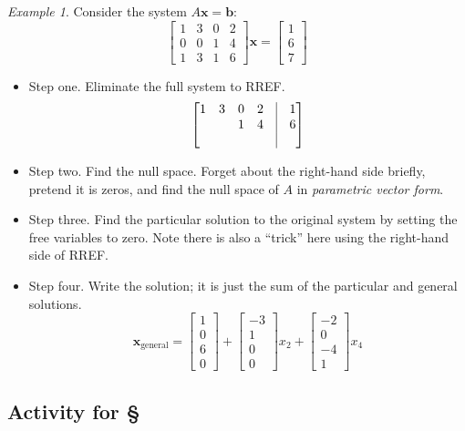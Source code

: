 \documentclass[11pt,oneside]{amsbook}
\theoremstyle{definition}
\theoremstyle{plain}
\theoremstyle{definition}
\theoremstyle{remark}
\newtheorem{example}[theorem]{Example}
\numberwithin{equation}{section}
\numberwithin{figure}{section}
\begin{document}
\begin{example}
  Consider the system $A\mathbf{x}=\mathbf{b}$:
  \[\begin{bmatrix}
      1&3&0&2\\0&0&1&4\\1&3&1&6
    \end{bmatrix}
    \mathbf{x}=
    \begin{bmatrix}
      1\\6\\7
    \end{bmatrix}
  \]
  \begin{itemize}
  \item Step one. Eliminate the full system to RREF.
    \[\begin{bmatrix}
        1&3&0&2&\vline&1\\
        &&1&4&\vline&6\\
        &&&&\vline&
      \end{bmatrix}
    \]
  \item Step two. Find the null space. Forget about the right-hand side briefly, pretend it is zeros, and find the null space of $A$ in \emph{parametric vector form}.
  \item Step three. Find the particular solution to the original system by setting the free variables to zero. Note there is also a ``trick'' here using the right-hand side of RREF.
  \item Step four. Write the solution; it is just the sum of the particular and general solutions.
    \[\mathbf{x}_{\mathrm{general}}
      =\begin{bmatrix}1\\0\\6\\0\end{bmatrix}
      +\begin{bmatrix}-3\\1\\0\\0\end{bmatrix}x_2
      +\begin{bmatrix}-2\\0\\-4\\1\end{bmatrix}x_4
    \]
  \end{itemize}
\end{example}

\newpage
\subsection*{Activity for \S \thesection}
\end{document}
